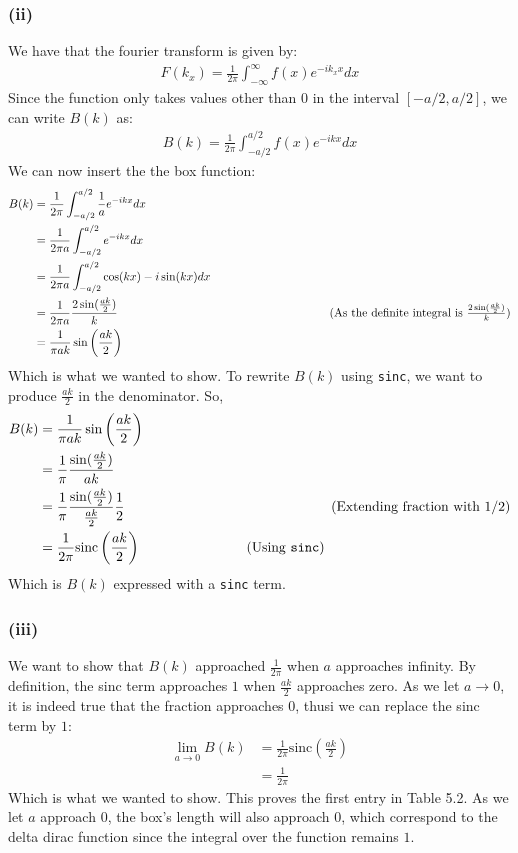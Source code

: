 \documentclass[a4paper]{article}
\newcommand{\comment}[1]{%
  \text{\phantom{(#1)}} \tag{#1}}
\begin{document}
\subsubsection{(ii)}
We have that the fourier transform is given by:
\begin{align*}
  F(k_x)=\frac{1}{2\pi}\int_{-\infty}^{\infty}f(x)e^{-ik_xx}dx
\end{align*}
Since the function only takes values other than $0$ in the interval $[-a/2, a/2]$, we can write $B(k)$ as:
\begin{align*}
  B(k)=\frac{1}{2\pi}\int_{-a/2}^{a/2}f(x)e^{-ikx}dx
\end{align*}
We can now insert the the box function:
\begin{align*}
  B(k)&=\frac{1}{2\pi}\int_{-a/2}^{a/2}\frac{1}{a}e^{-ikx}dx \\
        &= \frac{1}{2\pi a} \int_{-a/2}^{a/2}e^{-ikx}dx \\
        &= \frac{1}{2\pi a} \int_{-a/2}^{a/2}\cos(kx)-i\sin(kx)dx \\
        &= \frac{1}{2\pi a}\frac{2\sin(\frac{ak}{2})}{k} \comment{As the definite integral is $\frac{2\sin(\frac{ak}{2})}{k}$} \\
        &= \frac{1}{\pi ak}\sin\left(\frac{ak}{2}\right)
\end{align*}
Which is what we wanted to show. To rewrite $B(k)$ using \texttt{sinc}, we want to produce $\frac{ak}{2}$ in the denominator. So,
\begin{align*}
  B(k)&= \frac{1}{\pi ak}\sin\left(\frac{ak}{2}\right) \\
      &= \frac{1}{\pi}\frac{\sin(\frac{ak}{2})}{ak} \\
      &= \frac{1}{\pi}\frac{\sin(\frac{ak}{2})}{\frac{ak}{2}}\frac{1}{2} \comment{Extending fraction with $1/2$} \\
      &= \frac{1}{2\pi}\text{sinc}\left(\frac{ak}{2}\right) \comment{Using \texttt{sinc}}
\end{align*}
Which is $B(k)$ expressed with a \texttt{sinc} term.

\subsubsection{(iii)}
We want to show that $B(k)$ approached $\frac{1}{2\pi}$ when $a$ approaches infinity. By definition, the sinc term approaches $1$ when $\frac{ak}{2}$ approaches zero. As we let $a\rightarrow 0$, it is indeed true that the fraction approaches $0$, thusi we can replace the sinc term by $1$:
\begin{align*}
  \lim_{a\rightarrow 0}B(k)&=\frac{1}{2\pi}\text{sinc}\left(\frac{ak}{2}\right) \\
                           &= \frac{1}{2\pi}
\end{align*}
Which is what we wanted to show. This proves the first entry in Table 5.2. As we let $a$ approach $0$, the box's length will also approach $0$, which correspond to the delta dirac function since the integral over the function remains $1$.
\end{document}
